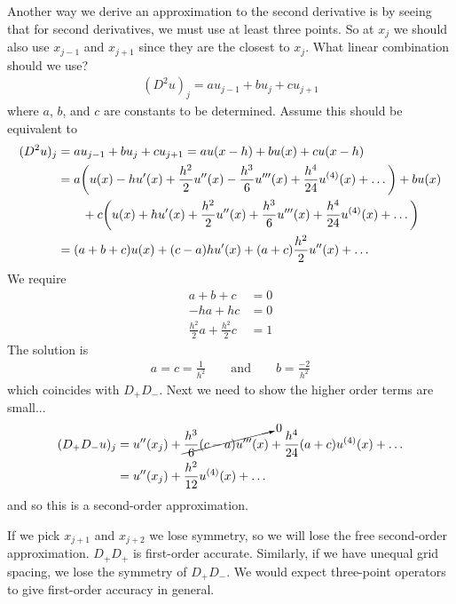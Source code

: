 \documentclass{article}
\begin{document}
            Another way we derive an approximation to the second derivative is by seeing that for second derivatives, we must use at least three points.  So at $x_j$ we should also use $x_{j-1}$ and $x_{j+1}$ since they are the closest to $x_j$.  What linear combination should we use?
            \begin{align}
                (D^2u)_j = au_{j-1} + bu_j + cu_{j+1}
            \end{align}
            where $a$, $b$, and $c$ are constants to be determined.  Assume this should be equivalent to
            \begin{align}
                (D^2u)_j &= au_{j-1} + bu_j + cu_{j+1} = a u(x-h) + b u(x) + c u(x - h) \\
                &= a\qty(u(x) - h u'(x) + \frac{h^2}{2}u''(x) - \frac{h^3}{6}u'''(x)+\frac{h^4}{24}u^{(4)}(x) + \dots) + b u(x) \\
                &\qquad + c\qty(u(x) + h u'(x) + \frac{h^2}{2}u''(x) + \frac{h^3}{6}u'''(x)+\frac{h^4}{24}u^{(4)}(x) + \dots) \\
                &= (a + b + c)u(x) + (c - a)hu'(x) + (a + c)\frac{h^2}{2}u''(x) + \dots
            \end{align}
            We require
            \begin{align}
                a + b + c &= 0 \\
                -ha + hc &= 0 \\
                \frac{h^2}{2}a + \frac{h^2}{2}c &= 1
            \end{align}
            The solution is
            \begin{align}
                a = c = \frac{1}{h^2} \qquad \text{and} \qquad b = \frac{-2}{h^2}
            \end{align}
            which coincides with $D_+D_-$.  Next we need to show the higher order terms are small...
            \begin{align}
                (D_+D_-u)_j &= u''(x_j) + \cancelto{0}{\frac{h^3}{6}{(c - a)}u'''(x)} + \frac{h^4}{24}(a + c)u^{(4)}(x) + \dots \\
                &= u''(x_j) + \frac{h^2}{12}u^{(4)}(x) + \dots
            \end{align}
            and so this is a second-order approximation.

            If we pick $x_{j+1}$ and $x_{j+2}$ we lose symmetry, so we will lose the free second-order approximation.  $D_+D_+$ is first-order accurate.  Similarly, if we have unequal grid spacing, we lose the symmetry of $D_+D_-$.  We would expect three-point operators to give first-order accuracy in general.
\end{document}
